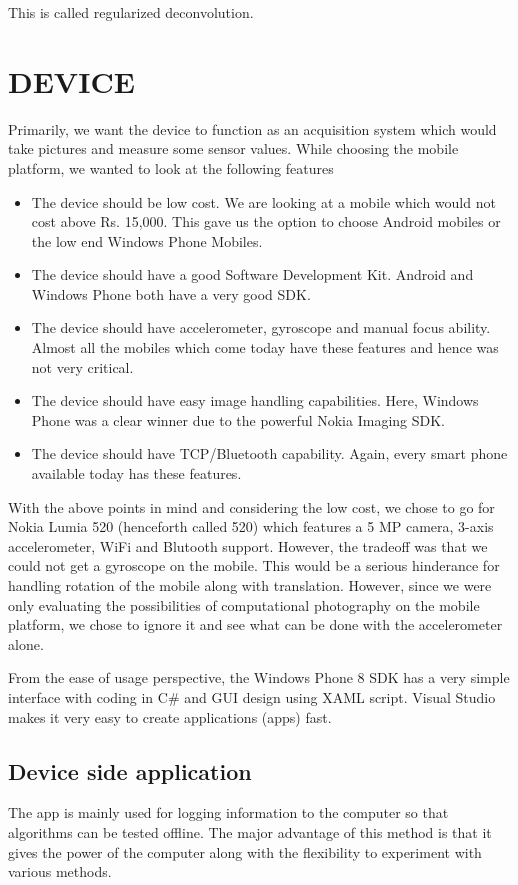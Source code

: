 \documentclass[BTech]{iitmdiss}
\begin{document}
This is called regularized deconvolution. 

\pagebreak
\chapter{DEVICE}
\label{chap:device}
Primarily, we want the device to function as an acquisition system which
would take pictures and measure some sensor values. While choosing the
mobile platform, we wanted to look at the following
features
\begin{itemize}
\item The device should be low cost. We are looking at a mobile which
would not cost above Rs. 15,000. This gave us the option to choose 
Android mobiles or the low end Windows Phone Mobiles.
\item The device should have a good Software Development Kit. Android
and Windows Phone both have a very good SDK.
\item The device should have accelerometer, gyroscope and manual focus
ability. Almost all the mobiles which come today have these features 
and hence was not very critical.
\item The device should have easy image handling capabilities. Here, 
Windows Phone was a clear winner due to the powerful Nokia Imaging SDK.
\item The device should have TCP/Bluetooth capability. Again, every 
smart phone available today has these features. 
\end{itemize}
 
With the above points in mind and considering the low cost, we chose to
go for Nokia Lumia 520 (henceforth called 520) which features a 5 MP
camera, 3-axis accelerometer, WiFi and Blutooth support. However, the 
tradeoff was that we could not get a gyroscope on the mobile. This 
would be a serious hinderance for handling rotation of the mobile along
with translation. However, since we were only evaluating the 
possibilities of computational photography on the mobile platform, we
chose to ignore it and see what can be done with the accelerometer 
alone. 

From the ease of usage perspective, the Windows Phone 8 SDK has a very
simple interface with coding in C\# and GUI design using XAML script. 
Visual Studio makes it very easy to create applications (apps) fast.

\section{Device side application}
\label{device:device_app}
The app is mainly used for logging information to the computer so that
algorithms can be tested offline. The major advantage of this method is
that it gives the power of the computer along with the flexibility to 
experiment with various methods. 
 
\end{document}
